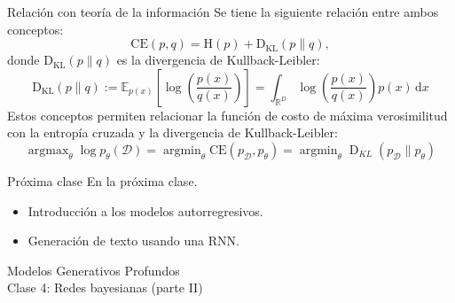 \documentclass{beamer}
\newcommand{\R}{\mathbb{R}}
\newcommand{\argmax}{\operatorname{argmax}}
\newcommand{\argmin}{\operatorname{argmin}}
\begin{document}
\begin{frame}{Relación con teoría de la información}
    Se tiene la siguiente relación entre ambos conceptos:
    \begin{equation*}
        \text{CE}(p,q) = \text{H}(p)+\operatorname{D_{KL}}(p\|q),
    \end{equation*}
    donde $\operatorname{D_{KL}}(p\|q)$ es la divergencia de Kullback-Leibler:
    \begin{equation*}
        \operatorname{D_{KL}}(p\|q)
        :=\mathbb{E}_{p(x)}\left[\log\left(\frac{p(x)}{q(x)}\right)\right]= \int_{\R^D} \log\left(\frac{p(x)}{q(x)}\right)p(x)\,\text{d}x
    \end{equation*}
    Estos conceptos permiten relacionar la función de costo de máxima verosimilitud con la entropía cruzada y la divergencia de Kullback-Leibler:
    \begin{equation*}
        \argmax_{\theta} \log p_\theta(\mathcal{D})
        =\argmin_\theta \text{CE}\left(p_{\mathcal{D}},p_\theta\right)
        = \argmin_\theta \operatorname{D}_{KL}\left(p_{\mathcal{D}}\|p_\theta\right)
    \end{equation*}
\end{frame}

\begin{frame}{Próxima clase}
    En la próxima clase.
    \begin{itemize}
        \item Introducción a los modelos autorregresivos.
        \item Generación de texto usando una RNN.
    \end{itemize}
\end{frame}

\begin{frame}
    \centering
    \Large{Modelos Generativos Profundos}\\
    \large{Clase 4: Redes bayesianas (parte II)}
\end{frame}
\end{document}
